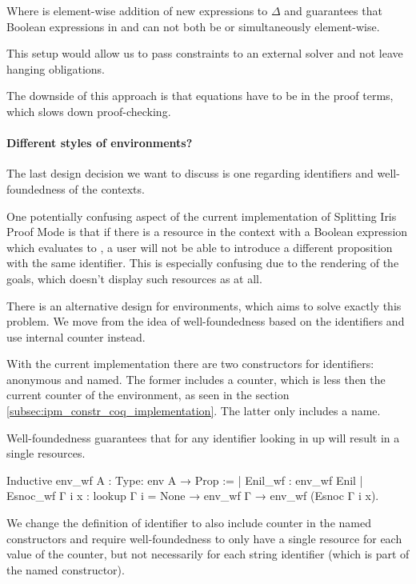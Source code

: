 {Where \coqe{$\Delta$[bs1]} is element-wise addition of new expressions to \(\Delta\) and  guarantees that Boolean expressions in  and  can not both be \true or \false simultaneously element-wise.

This setup would allow us to pass constraints to an external solver and not leave hanging obligations.

The downside of this approach is that equations have to be in the proof terms, which slows down proof-checking.

\paragraph{Different styles of environments?}

The last design decision we want to discuss is one regarding identifiers and well-foundedness of the contexts.

One potentially confusing aspect of the current implementation of Splitting Iris Proof Mode is that if there is a resource  in the context with a Boolean expression which evaluates to \false, a user will not be able to introduce a different proposition with the same identifier.
This is especially confusing due to the rendering of the goals, which doesn't display such resources as  at all.

There is an alternative design for environments, which aims to solve exactly this problem.
We move from the idea of well-foundedness based on the identifiers and use internal counter instead.

With the current implementation there are two constructors for identifiers: anonymous and named.
The former includes a counter, which is less then the current counter of the environment, as seen in the section \ref{subsec:ipm_constr_coq_implementation}.
The latter only includes a name.

Well-foundedness guarantees that for any identifier looking in up will result in a single resources.
\begin{coq}
  Inductive env_wf {A : Type}: env A → Prop :=
  | Enil_wf : env_wf Enil
  | Esnoc_wf Γ i x : lookup Γ i = None → env_wf Γ → env_wf (Esnoc Γ i x).
\end{coq}

We change the definition of identifier to also include counter in the named constructors and require well-foundedness to only have a single resource for each value of the counter, but not necessarily for each string identifier (which is part of the named constructor).

}
